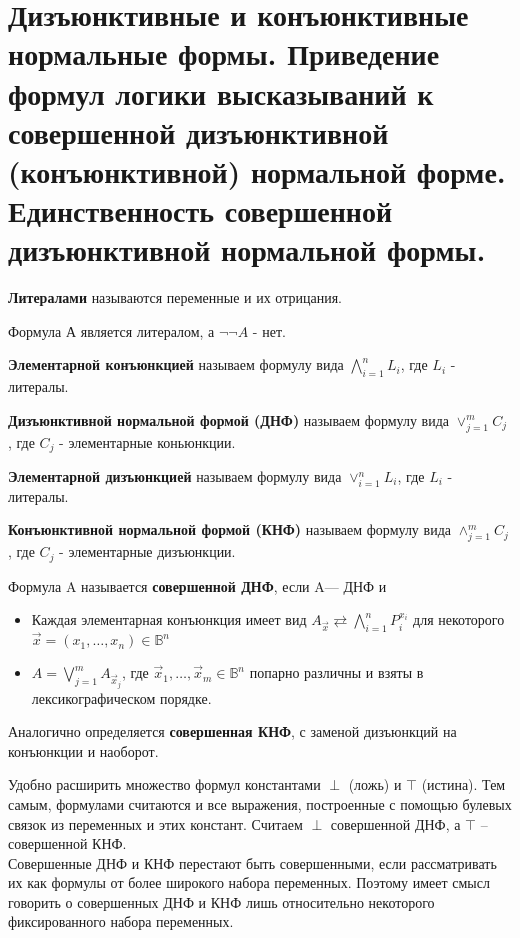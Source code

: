 \section{Дизъюнктивные и конъюнктивные нормальные формы. Приведение формул логики высказываний к совершенной
дизъюнктивной (конъюнктивной) нормальной форме. Единственность совершенной дизъюнктивной
нормальной формы.}

\begin{definition}
	\textbf{Литералами} называются переменные и их отрицания.
\end{definition}
\begin{example}
	Формула А является литералом, а $ \neg\neg A$ - нет.
\end{example}

\begin{definition}
	\textbf{Элементарной конъюнкцией} называем формулу вида $\bigwedge^{n}_{i=1}L_{i}$, где $ L_{i} $ - литералы.

	\textbf{Дизъюнктивной нормальной формой (ДНФ)} называем формулу вида $\vee^{m}_{j=1}C_{j}$ , где $ C_{j} $ -
	элементарные коньюнкции.

	\textbf{Элементарной дизъюнкцией} называем формулу вида
	$\vee^{n}_{i=1}L_{i}$, где $ L_{i} $ - литералы.  

	\textbf{Конъюнктивной нормальной формой (КНФ)} называем формулу вида $\wedge^{m}_{j=1}C_{j}$ , где $ C_{j} $ -
	элементарные дизъюнкции.
\end{definition}

\begin{definition}
	Формула A называется \textbf{совершенной ДНФ}, если A— ДНФ и 
	\begin{itemize}
		\item Каждая элементарная конъюнкция имеет вид 
			$ A_{\vec{x}} \rightleftarrows \bigwedge_{i=1}^{n} P_{i}^{x_{i}} $
			для некоторого $\vec{x} = (x_1,\ldots,x_n) \in \mathbb{B}^n$ 
		\item $A=\bigvee_{j=1}^m A_{\vec{x}_j}$, где $\vec{x}_1,\ldots,\vec{x}_m \in \mathbb{B}^{n}$ попарно
			различны и взяты в лексикографическом порядке.
	\end{itemize}
	Аналогично определяется \textbf{совершенная КНФ}, с заменой дизъюнкций
	на конъюнкции и наоборот.
\end{definition}
\begin{remark} 
	Удобно расширить множество формул константами
	$\perp$ (ложь) и $\top$ (истина). Тем самым, формулами считаются и все выражения, построенные с помощью булевых
	связок из переменных и этих констант. Считаем $\perp$ совершенной ДНФ, а $\top$ -- совершенной КНФ.\\
	Совершенные ДНФ и КНФ перестают быть совершенными, если рассматривать их как формулы от более широкого набора
	переменных. Поэтому имеет смысл говорить о совершенных ДНФ и КНФ лишь относительно некоторого фиксированного
	набора переменных.
\end{remark}

